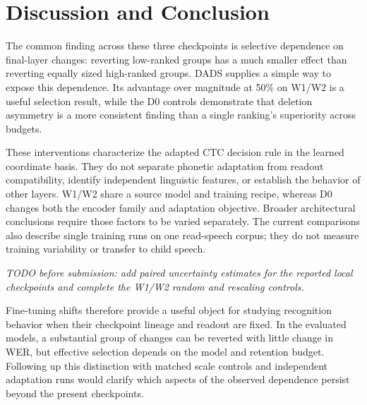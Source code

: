 \documentclass{article}
\begin{document}
\section{Discussion and Conclusion}
\label{sec:conclusion}
The common finding across these three checkpoints is selective dependence on final-layer changes: reverting low-ranked groups has a much smaller effect than reverting equally sized high-ranked groups. DADS supplies a simple way to expose this dependence. Its advantage over magnitude at 50\% on W1/W2 is a useful selection result, while the D0 controls demonstrate that deletion asymmetry is a more consistent finding than a single ranking's superiority across budgets.

These interventions characterize the adapted CTC decision rule in the learned coordinate basis. They do not separate phonetic adaptation from readout compatibility, identify independent linguistic features, or establish the behavior of other layers. W1/W2 share a source model and training recipe, whereas D0 changes both the encoder family and adaptation objective. Broader architectural conclusions require those factors to be varied separately. The current comparisons also describe single training runs on one read-speech corpus; they do not measure training variability or transfer to child speech.

\noindent\textit{TODO before submission: add paired uncertainty estimates for the reported local checkpoints and complete the W1/W2 random and rescaling controls.}

Fine-tuning shifts therefore provide a useful object for studying recognition behavior when their checkpoint lineage and readout are fixed. In the evaluated models, a substantial group of changes can be reverted with little change in WER, but effective selection depends on the model and retention budget. Following up this distinction with matched scale controls and independent adaptation runs would clarify which aspects of the observed dependence persist beyond the present checkpoints.

\clearpage


\end{document}
